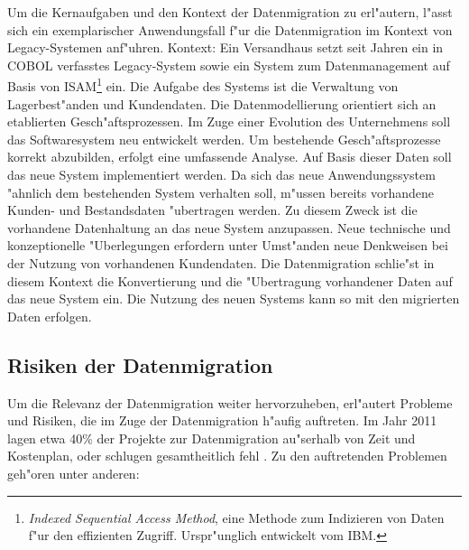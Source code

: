Um die Kernaufgaben und den Kontext der Datenmigration zu erl"autern, l"asst sich ein exemplarischer Anwendungsfall f"ur die Datenmigration im Kontext von Legacy-Systemen anf"uhren.
\lb
Kontext:
Ein Versandhaus setzt seit Jahren ein in COBOL verfasstes Legacy-System sowie ein System zum Datenmanagement auf Basis von ISAM\footnote{\textit{Indexed Sequential Access Method}, eine Methode zum Indizieren von Daten f"ur den effizienten Zugriff. Urspr"unglich entwickelt vom IBM.} ein. Die Aufgabe des Systems ist die Verwaltung von Lagerbest"anden und Kundendaten. Die Datenmodellierung orientiert sich an etablierten Gesch"aftsprozessen. 
\lb
Im Zuge einer Evolution des Unternehmens soll das Softwaresystem neu entwickelt werden. Um bestehende Gesch"aftsprozesse korrekt abzubilden, erfolgt eine umfassende Analyse. Auf Basis dieser Daten soll das neue System implementiert werden. Da sich das neue Anwendungssystem "ahnlich dem bestehenden System verhalten soll, m"ussen bereits vorhandene Kunden- und Bestandsdaten "ubertragen werden. Zu diesem Zweck ist die vorhandene Datenhaltung an das neue System anzupassen. Neue technische und konzeptionelle "Uberlegungen erfordern unter Umst"anden neue Denkweisen bei der Nutzung von vorhandenen Kundendaten. Die Datenmigration schlie"st in diesem Kontext die Konvertierung und die "Ubertragung vorhandener Daten auf das neue System ein. Die Nutzung des neuen Systems kann so mit den migrierten Daten erfolgen.

\newpage

\subsection{Risiken der Datenmigration}

Um die Relevanz der Datenmigration weiter hervorzuheben, erl"autert \citep{morris-2012} Probleme und Risiken, die im Zuge der Datenmigration h"aufig auftreten. Im Jahr 2011 lagen etwa 40\% der Projekte zur Datenmigration au"serhalb von Zeit und Kostenplan, oder schlugen gesamtheitlich fehl \citep{howard-2011}. Zu den auftretenden Problemen geh"oren unter anderen:

